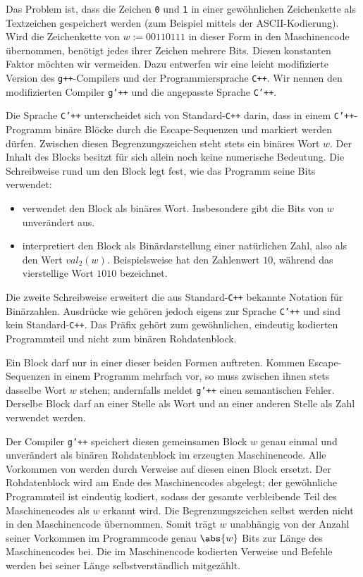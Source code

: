 Das Problem ist, dass die Zeichen \texttt{0} und \texttt{1} in einer gewöhnlichen Zeichenkette als Textzeichen gespeichert werden (zum Beispiel mittels der \gls{ASCII}-Kodierung). Wird die Zeichenkette von $w := 00110111$ in dieser Form in den Maschinencode übernommen, benötigt jedes ihrer Zeichen mehrere Bits. Diesen konstanten Faktor möchten wir vermeiden. Dazu entwerfen wir eine leicht modifizierte Version des \texttt{g++}-Compilers und der Programmiersprache \texttt{C++}. Wir nennen den modifizierten Compiler \texttt{g'++} und die angepasste Sprache \texttt{C'++}.
\par
Die Sprache \texttt{C'++} unterscheidet sich von Standard-\texttt{C++} darin, dass in einem \texttt{C'++}-Programm binäre Blöcke durch die Escape-Sequenzen \cppinline{***} und \cppinline{+++} markiert werden dürfen. Zwischen diesen Begrenzungszeichen steht stets ein binäres Wort $w$. Der Inhalt des Blocks besitzt für sich allein noch keine numerische Bedeutung. Die Schreibweise rund um den Block legt fest, wie das Programm seine Bits verwendet:
\begin{itemize}
	\item \texttt{} verwendet den Block als binäres Wort. Insbesondere gibt \texttt{} die Bits von $w$ unverändert aus.
	\item {} interpretiert den Block als Binärdarstellung einer natürlichen Zahl, also als den Wert $val_2(w)$. Beispielsweise hat  den Zahlenwert $10$, während \texttt{} das vierstellige Wort $1010$ bezeichnet.
\end{itemize}
Die zweite Schreibweise erweitert die aus Standard-\texttt{C++} bekannte Notation  für Binärzahlen. Ausdrücke wie  gehören jedoch eigens zur Sprache \texttt{C'++} und sind kein Standard-\texttt{C++}. Das Präfix  gehört zum gewöhnlichen, eindeutig kodierten Programmteil und nicht zum binären Rohdatenblock.
\par
Ein Block darf nur in einer dieser beiden Formen auftreten. Kommen Escape-Sequenzen in einem Programm mehrfach vor, so muss zwischen ihnen stets dasselbe Wort $w$ stehen; andernfalls meldet \texttt{g'++} einen semantischen Fehler. Derselbe Block darf an einer Stelle als Wort und an einer anderen Stelle als Zahl verwendet werden.
\par
Der Compiler \texttt{g'++} speichert diesen gemeinsamen Block $w$ genau einmal und unverändert als binären Rohdatenblock im erzeugten Maschinencode. Alle Vorkommen von  werden durch Verweise auf diesen einen Block ersetzt. Der Rohdatenblock wird am Ende des Maschinencodes abgelegt; der gewöhnliche Programmteil ist eindeutig kodiert, sodass der gesamte verbleibende Teil des Maschinencodes als $w$ erkannt wird. Die Begrenzungszeichen selbst werden nicht in den Maschinencode übernommen. Somit trägt $w$ unabhängig von der Anzahl seiner Vorkommen im Programmcode genau $\abs{w}$ Bits zur Länge des Maschinencodes bei. Die im Maschinencode kodierten Verweise und Befehle werden bei seiner Länge selbstverständlich mitgezählt.
